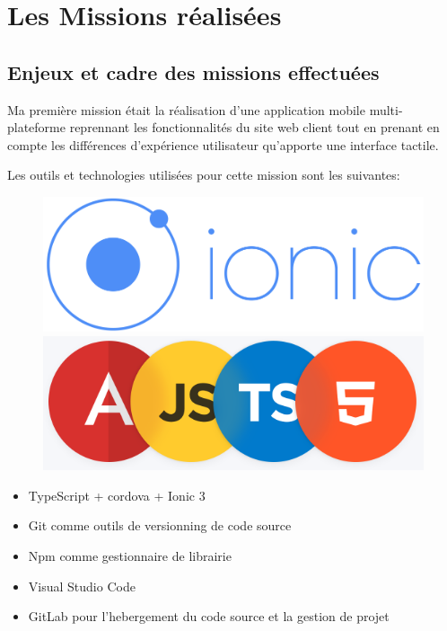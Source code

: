 \chapter{Les Missions réalisées}
\section{Enjeux et cadre des missions effectuées}
Ma première mission était la réalisation d'une application mobile multi-plateforme 
reprennant les fonctionnalités du site web client tout en prenant en compte 
les différences d'expérience utilisateur qu'apporte une interface tactile.\newline

Les outils et technologies utilisées pour cette mission sont les suivantes:

\begin{figure}[!h]
    \centering
    \begin{minipage}[b]{0.4\textwidth}
      \includegraphics[width=\textwidth]{Images/ionic-logo}
    \end{minipage}
    \hfill
    \begin{minipage}[b]{0.4\textwidth}
      \includegraphics[width=\textwidth]{Images/ajsthtml5}
    \end{minipage}
  \end{figure}
  
\begin{itemize}
    \item TypeScript + cordova + Ionic 3
    \item Git comme outils de versionning de code source
    \item Npm comme gestionnaire de librairie 
    \item Visual Studio Code
    \item GitLab pour l'hebergement du code source et la gestion de projet 
\end{itemize} 

